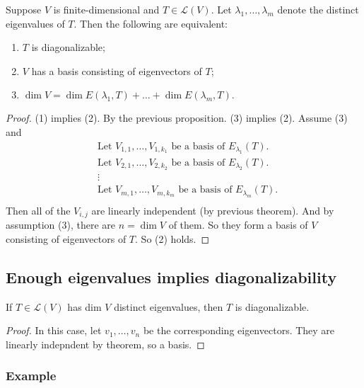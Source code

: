 \documentclass[11pt]{article}
\begin{document}
    Suppose $V$ is finite-dimensional and \(T \in \mathcal{L}(V)\). Let \(\lambda_1, \dots, \lambda_m\) denote the distinct eigenvalues of $T$. Then the following are equivalent:
    \begin{enumerate}
        \item $T$ is diagonalizable;
        \item $V$ has a basis consisting of eigenvectors of $T$;
        \item \(\dim V = \dim E(\lambda_1, T) + \dots + \dim E(\lambda_m, T). \)
    \end{enumerate}
    \begin{proof}
        (1) implies (2). By the previous proposition.
        (3) implies (2). Assume (3) and
        \begin{align*}
            &\text{Let } V_{1,1}, \dots, V_{1, k_1} \text{ be a basis of } E_{\lambda_1}(T). \\
            &\text{Let } V_{2,1}, \dots, V_{2, k_2} \text{ be a basis of } E_{\lambda_2}(T). \\
            & \vdots \\
            &\text{Let } V_{m,1}, \dots, V_{m, k_m} \text{ be a basis of } E_{\lambda_m}(T). \\
        \end{align*}
        Then all of the \(V_{i,j}\) are linearly independent (by previous theorem). And by assumption (3), there are \(n = \dim V\) of them. So they form a basis of $V$ consisting of eigenvectors of $T$. So (2) holds.
    \end{proof}

    \subsection{Enough eigenvalues implies diagonalizability}

    If \(T \in \mathcal{L}(V)\) has dim $V$ distinct eigenvalues, then $T$ is diagonalizable.

    \begin{proof}
        In this case, let \(v_1, \dots, v_n\) be the corresponding eigenvectors. They are linearly indepndent by theorem, so a basis. 
    \end{proof}

    \subsubsection{Example}
\end{document}
